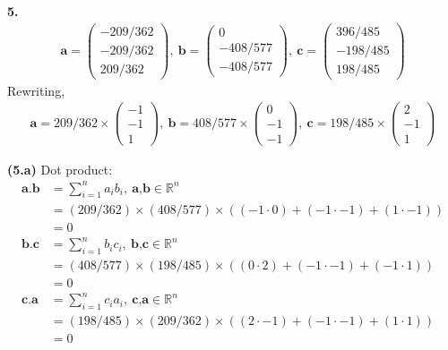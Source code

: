\documentclass[12pt,letterpaper,fleqn]{article}
\theoremstyle{definition}
\begin{document}
\newpage
\textbf{5.} 
\begin{align*}
\textbf{a} = 
\begin{pmatrix}
-209/362\\
-209/362\\
209/362
\end{pmatrix},~
\textbf{b} = 
\begin{pmatrix}
0\\
-408/577\\
-408/577
\end{pmatrix},~
\textbf{c} = 
\begin{pmatrix}
396/485\\
-198/485\\
198/485
\end{pmatrix}
\end{align*}
Rewriting,
\begin{equation*}
\begin{split}
\textbf{a} = 209/362 \times
\begin{pmatrix}
-1\\
-1\\
1
\end{pmatrix},~
\textbf{b} = 408/577 \times
\begin{pmatrix}
0\\
-1\\
-1
\end{pmatrix},~
\textbf{c} = 198/485 \times
\begin{pmatrix}
2\\
-1\\
1
\end{pmatrix}
\end{split}
\end{equation*}


\textbf{(5.a)} Dot product:
\begin{equation*}
\begin{split}
\textbf{a.b} &= \sum_{i=1}^{n} a_i b_i,~ \textbf{a,b} \in \mathbb{R}^n\\
 &= (209/362) \times (408/577) \times ((-1\cdot0) + (-1\cdot-1) + (1\cdot-1))\\
&= 0\\
\textbf{b.c} &= \sum_{i=1}^{n} b_i c_i,~ \textbf{b,c} \in \mathbb{R}^n\\
 &= (408/577) \times (198/485) \times ((0\cdot2) + (-1\cdot-1) + (-1\cdot1))\\
&= 0\\
\textbf{c.a} &= \sum_{i=1}^{n} c_i a_i,~ \textbf{c,a} \in \mathbb{R}^n\\
 &= (198/485) \times (209/362) \times ((2\cdot-1) + (-1\cdot-1) + (1\cdot1))\\
&= 0
\end{split}
\end{equation*}
\end{document}
